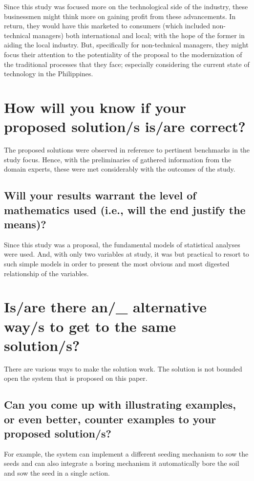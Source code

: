 Since this study was focused more on the technological side of the industry, these businessmen might think more on gaining profit from these advancements. In return, they would have this marketed to consumers (which included non-technical managers) both international and local; with the hope of the former in aiding the local industry. But, specifically for non-technical managers, they might focus their attention to the potentiality of the proposal to the modernization of the traditional processes that they face; especially considering the current state of technology in the Philippines.
			
\section{How will you know if your proposed solution/s is/are correct?}

The proposed solutions were observed in reference to pertinent benchmarks in the study focus. Hence, with the preliminaries of gathered information from the domain experts, these were met considerably with the outcomes of the study.

		\subsection{Will your results warrant the level of mathematics used (i.e., will the end justify the means)?}

Since this study was a proposal, the fundamental models of statistical analyses were used. And, with only two variables at study, it was but practical to resort to such simple models in order to present the most obvious and most digested relationship of the variables.	    
			
\section{Is/are there an/\_ alternative way/s to get to the same solution/s?}
There are various ways to make the solution work. The solution is not bounded open the system that is proposed on this paper.


		\subsection{Can you come up with illustrating examples, or even better, counter examples to your proposed solution/s?}
For example, the system can implement a different seeding mechanism to sow the seeds and can also integrate a boring mechanism it automatically bore the soil and sow the seed in a single action.
